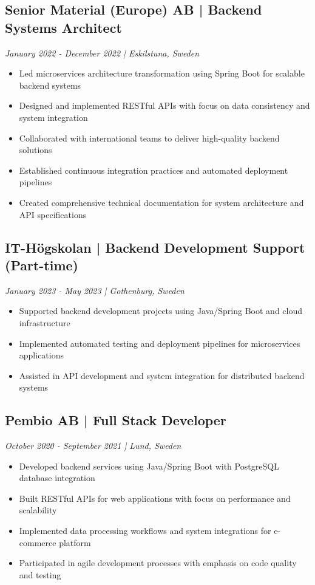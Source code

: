 \documentclass[11pt,a4paper]{article}
\begin{document}
\subsection*{Senior Material (Europe) AB | Backend Systems Architect}
\textit{January 2022 - December 2022 | Eskilstuna, Sweden}
\begin{itemize}[noitemsep]
\item Led microservices architecture transformation using Spring Boot for scalable backend systems
\item Designed and implemented RESTful APIs with focus on data consistency and system integration
\item Collaborated with international teams to deliver high-quality backend solutions
\item Established continuous integration practices and automated deployment pipelines
\item Created comprehensive technical documentation for system architecture and API specifications
\end{itemize}

\subsection*{IT-Högskolan | Backend Development Support (Part-time)}
\textit{January 2023 - May 2023 | Gothenburg, Sweden}
\begin{itemize}[noitemsep]
\item Supported backend development projects using Java/Spring Boot and cloud infrastructure
\item Implemented automated testing and deployment pipelines for microservices applications
\item Assisted in API development and system integration for distributed backend systems
\end{itemize}

\subsection*{Pembio AB | Full Stack Developer}
\textit{October 2020 - September 2021 | Lund, Sweden}
\begin{itemize}[noitemsep]
\item Developed backend services using Java/Spring Boot with PostgreSQL database integration
\item Built RESTful APIs for web applications with focus on performance and scalability
\item Implemented data processing workflows and system integrations for e-commerce platform
\item Participated in agile development processes with emphasis on code quality and testing
\end{itemize}
\end{document}
